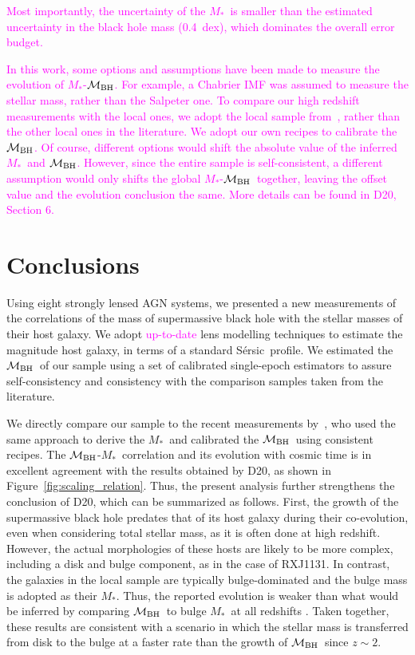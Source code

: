 \documentclass[fleqn,usenatbib]{mnras}
\newcommand{\mbh}{$\mathcal M_{\rm BH}$}
\newcommand{\sersic}{S\'ersic}
\newcommand{\mstar}{{$M_*$}}
\newcommand{\pink}[1]{{\textcolor{magenta}{#1}}}
\begin{document}
\pink{Most importantly, the uncertainty of the \mstar\ is smaller than the estimated uncertainty in the black hole mass (0.4~dex), which dominates the overall error budget.}

\pink{In this work, some options and assumptions have been made to measure the evolution of \mstar-\mbh. For example, a Chabrier IMF was assumed to measure the stellar mass, rather than the Salpeter one. To compare our high redshift measurements with the local ones, we adopt the local sample from~\citet{Bennert++2011, H+R04}, rather than the other local ones in the literature. We adopt our own recipes to calibrate the \mbh. Of course, different options would shift the absolute value of the inferred \mstar\ and \mbh. However, since the entire sample is self-consistent, a different assumption would only shifts the global \mstar-\mbh\ together, leaving the offset value and the evolution conclusion the same. More details can be found in D20, Section 6.}

\section{Conclusions}\label{sec:con}
Using eight strongly lensed AGN systems, we presented a new measurements of the correlations of the mass of supermassive black hole with the stellar masses of their host galaxy. We adopt \pink{up-to-date} lens modelling techniques to estimate the magnitude host galaxy, in terms of a standard \sersic\ profile. We estimated the \mbh\ of our sample using a set of calibrated single-epoch estimators to assure self-consistency and consistency with the comparison samples taken from the literature.

We directly compare our sample to the recent measurements by~\citet[][D20]{Ding2020a}, who used the same approach to derive the \mstar\ and calibrated the \mbh\ using consistent recipes. The \mbh-\mstar\ correlation and its evolution with cosmic time is in excellent agreement with the results obtained by D20, as shown in Figure~\ref{fig:scaling_relation}. Thus, the present analysis further strengthens the conclusion of D20, which can be summarized as follows. First, the growth of the supermassive black hole predates that of its host galaxy during their co-evolution, even when considering total stellar mass, as it is often done at high redshift. However, the actual morphologies of these hosts are likely to be more complex, including a disk and bulge component, as in the case of  RXJ1131. In contrast, the galaxies in the local sample are typically bulge-dominated and the bulge mass is adopted as their  \mstar. Thus, the reported evolution is weaker than what would be inferred by comparing \mbh\ to bulge \mstar\ at all redshifts \citep{Bennert++2011}. Taken together, these results are consistent with a scenario in which the stellar mass is transferred from disk to the bulge at a faster rate than the growth of \mbh\ since $z\sim2$.
\end{document}
